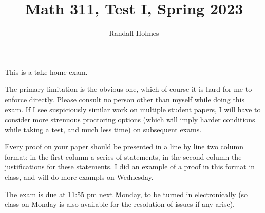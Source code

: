 \documentclass[12pt]{article}
\title{Math 311, Test I, Spring 2023}
\author{Randall Holmes}
\begin{document}
\maketitle

This is a take home exam.

The primary limitation is the obvious one, which of course it is hard for me to enforce directly.  Please consult no person other than myself
while doing this exam.  If I see suspiciously similar work on multiple student papers, I will have to consider more strenuous proctoring options (which will imply harder conditions while taking a test, and much less time) on subsequent exams.

Every proof on your paper should be presented in a line by line two column format:  in the first column a series of statements, in the second column the justifications for these statements.  I did an example of a proof in this format in class, and will do more exampls on Wednesday.

The exam is due at 11:55 pm  next Monday, to be turned in electronically (so class on Monday is also available for the resolution of issues if any arise).

\newpage
\end{document}
